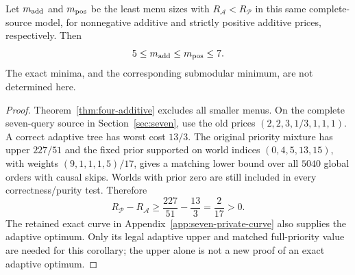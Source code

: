 \begin{corollary}
\label{cor:additive-first-interval}
Let $m_{\rm add}$ and $m_{\rm pos}$ be the least menu sizes with
$R_{\mathcal A}<R_{\mathcal P}$ in this same complete-source model,
for nonnegative additive and strictly positive additive prices,
respectively. Then
\[
 5\leq m_{\rm add}\leq m_{\rm pos}\leq7.
\]
The exact minima, and the corresponding submodular minimum, are
not determined here.
\end{corollary}
\begin{proof}
Theorem~\ref{thm:four-additive} excludes all smaller menus. On the
complete seven-query source in Section~\ref{sec:seven}, use the old
prices $(2,2,3,1/3,1,1,1)$. A correct adaptive tree has worst cost
$13/3$. The original priority mixture has upper $227/51$ and the
fixed prior supported on world indices $(0,4,5,13,15)$, with
weights $(9,1,1,1,5)/17$, gives a matching lower bound over all
$5040$ global orders with causal skips. Worlds with prior zero
are still included in every correctness/purity test. Therefore
\[
 R_{\mathcal P}-R_{\mathcal A}\geq
  \frac{227}{51}-\frac{13}{3}=\frac{2}{17}>0.
\]
The retained exact curve in Appendix~\ref{app:seven-private-curve}
also supplies the adaptive optimum. Only its legal adaptive upper
and matched full-priority value are needed for this corollary;
the upper alone is not a new proof of an exact adaptive optimum.
\end{proof}

